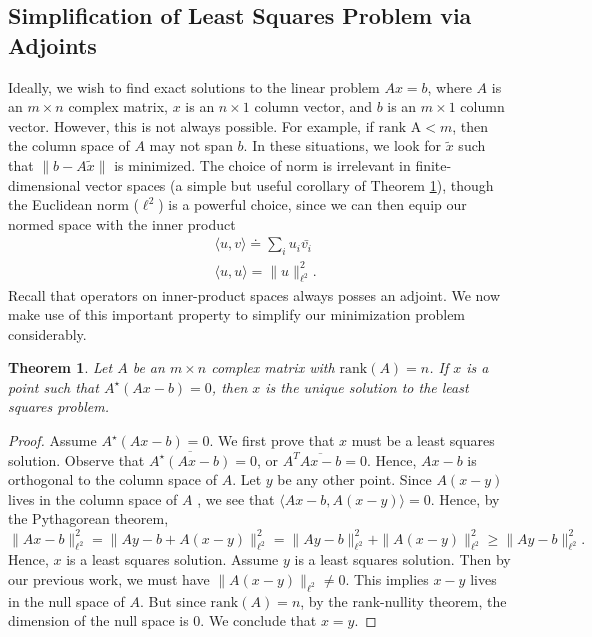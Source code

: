 \documentclass[12pt]{article}
\theoremstyle{plain}
\newtheorem{theorem}{Theorem}
\theoremstyle{definition}
\theoremstyle{remark}
\numberwithin{equation}{section}  %
\begin{document}
\subsection{Simplification of Least Squares Problem via Adjoints} 
Ideally, we wish to find exact solutions to the linear problem $Ax = b$, where
$A$ is an $m \times n$ complex matrix, $x$ is an $n \times 1$ column vector, and
$b$ is an $m \times 1$ column vector. However, this is not always possible. For
example, if $\text{rank A} < m$, then the column space of $A$ may not span $b$.
In these situations, we look for $\tilde{x}$ such that $ \| b - A\tilde{x}\|$ is
minimized. The choice of norm is irrelevant in finite-dimensional vector spaces (a
simple but useful corollary of Theorem \ref{thm:adj-ls}),
though the Euclidean norm ($\ell^2$) is a powerful choice, since we can then
equip our normed space with the inner product
\begin{equation*}
\begin{split}
& \langle u, v \rangle \doteq \sum_i u_i \bar{v_i}
\\
&  \langle u, u \rangle =\| u \|_{\ell^2}^2.
\end{split}
\end{equation*}
Recall that operators on inner-product spaces always posses an adjoint. We now
make use of this important property to simplify our minimization problem
considerably.
\begin{theorem}
\label{thm:adj-ls}
Let $A$ be an $m \times n$ complex matrix with $\text{rank}(A) = n$. 
If $x$ is a point such that $A^{\star} (Ax - b) = 0$, then $x$ is the unique solution 
to the least squares problem.
\end{theorem} 
\begin{proof}
Assume $A^{\star}(Ax-b) = 0$. We first prove that $x$ must be a least squares solution. Observe that
 $\overline{A^{\star}(Ax-b)} = 0$, or $A^T
\overline{Ax-b} = 0$. Hence, $Ax-b$ is orthogonal to the column space of $A$. 
Let $y$ be any other point. Since $A(x-y)$ lives in the column space of $A$
, we see that $\langle Ax-b, A(x-y) \rangle = 0$. Hence, by the Pythagorean theorem,
\begin{equation*}
\| Ax - b \|_{\ell^2}^2 = \| Ay - b + A(x-y)
\|_{\ell^2}^2 = \| Ay - b \|_{\ell^2}^2 + \| A(x-y) \|_{\ell^2}^2 \ge \| Ay - b
\|_{\ell^2}^2.
\end{equation*}
Hence, $x$ is a least squares solution. Assume $y$ is a least squares solution. Then by our previous work, 
we must have $ \| A(x - y) \|_{\ell^2} \neq 0$. This implies $x-y$ lives in the null space of $A$.
But since $\text{rank}(A) = n$, by the rank-nullity theorem, the dimension of the null space 
is $0$. We conclude that $x = y$. 
\end{proof}
\end{document}
